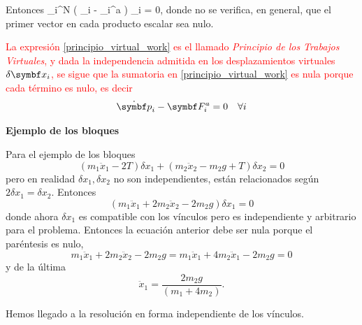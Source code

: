 \documentclass[10pt,oneside]{CBFT_book}
\begin{document}
Entonces
\be
	\sum_i^N \left( _i - _i^a \right) \cdot \delta{}_i = 0,
	\label{principio_virtual_work}
\ee
donde no se verifica, en general, que el primer vector en cada producto escalar sea nulo.

\textcolor{red}{
La expresión \eqref{principio_virtual_work} es el llamado {\it Principio de los Trabajos Virtuales},
y dada la independencia admitida en los desplazamientos virtuales $ \delta \vb{x}_i $, se sigue que la
sumatoria en \eqref{principio_virtual_work} es nula porque cada término es nulo, es decir
\[
	\dot{\vb{p}}_i - \vb{F}_i^a = 0 \quad \forall i
\]
}

\begin{ejemplo}{\bf Ejemplo de los bloques}

Para el ejemplo de los bloques
\[
	( m_1 \ddot{x}_1 - 2T )\delta x_1 + ( m_2 \ddot{x}_2 - m_2 g + T) \delta x_2 = 0
\]
pero en realidad $\delta x_1, \delta x_2$ no son independientes, están relacionados según $2\delta x_1 = \delta x_2$.
Entonces
\[
	( m_1 \ddot{x}_1 + 2 m_2 \ddot{x}_2 - 2 m_2 g )\delta x_1 = 0
\]
donde ahora $\delta x_1$ es compatible con los vínculos pero es independiente y arbitrario para el problema.
Entonces la ecuación anterior debe ser nula porque el paréntesis es nulo,
\[
	m_1 \ddot{x}_1 + 2 m_2 \ddot{x}_2 - 2 m_2 g = m_1 \ddot{x}_1 + 4 m_2 \ddot{x}_1 - 2 m_2 g = 0
\]
y de la última 
\[
	\ddot{x}_1 = \frac{2 m_2 g}{ (m_1 + 4m_2 ) }.
\]

Hemos llegado a la resolución en forma independiente de los vínculos.
\end{ejemplo}
\end{document}
